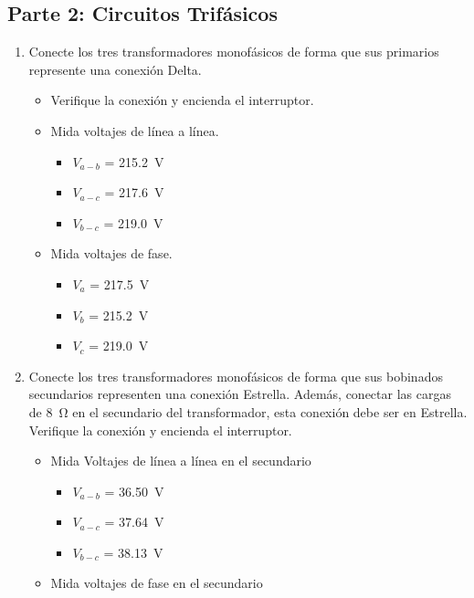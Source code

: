 \documentclass[12pt,a4paper]{article}
\begin{document}
\subsection{Parte 2: Circuitos Trifásicos}

\begin{enumerate}
    \item Conecte los tres transformadores monofásicos de forma que sus primarios represente una conexión Delta.
    \begin{itemize}
        \item Verifique la conexión y encienda el interruptor.
        \item Mida voltajes de línea a línea.
        \begin{itemize}
            \item $V_{a-b}$ = \SI{215.2}{\volt}
            \item $V_{a-c}$ = \SI{217.6}{\volt}
            \item $V_{b-c}$ = \SI{219.0}{\volt}
        \end{itemize}
        \item Mida voltajes de fase.
        \begin{itemize}
            \item $V_{a}$ = \SI{217.5}{\volt}
            \item $V_{b}$ = \SI{215.2}{\volt}
            \item $V_{c}$ = \SI{219.0}{\volt}
        \end{itemize}
    \end{itemize}
    \item Conecte los tres transformadores monofásicos de forma que sus bobinados secundarios representen una conexión Estrella. Además, conectar las cargas de \SI{8}{\ohm} en el secundario del transformador, esta conexión debe ser en Estrella. Verifique la conexión y encienda el interruptor.
    \begin{itemize}
        \item Mida Voltajes de línea a línea en el secundario
        \begin{itemize}
            \item $V_{a-b}$ = \SI{36.50}{\volt}
            \item $V_{a-c}$ = \SI{37.64}{\volt}
            \item $V_{b-c}$ = \SI{38.13}{\volt}
        \end{itemize}
        \item Mida voltajes de fase en el secundario
        \begin{itemize}

\end{itemize}
\end{itemize}
\end{enumerate}
\end{document}
